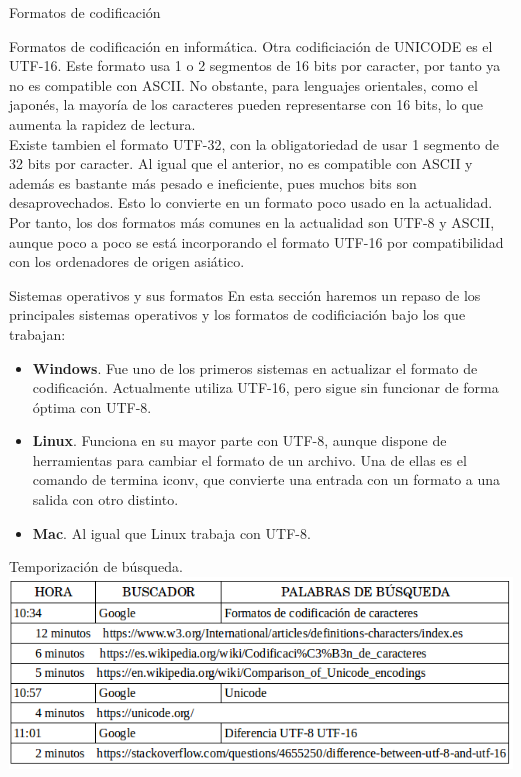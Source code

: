 \begin{section}{Formatos de codificaci\'on}
\begin{subsection}{Formatos de codificación en informática.}
			Otra codificiación de UNICODE es el UTF-16. Este formato usa 1 o 2 segmentos de 16 bits por caracter, por tanto ya no es compatible con ASCII. No obstante, para lenguajes orientales, como el japonés, la mayoría de los caracteres pueden representarse con 16 bits, lo que aumenta la rapidez de lectura. \\ 
			
			Existe tambien el formato UTF-32, con la obligatoriedad de usar 1 segmento de 32 bits por caracter. Al igual que el anterior, no es compatible con ASCII y además es bastante más pesado e ineficiente, pues muchos bits son desaprovechados. Esto lo convierte en un formato poco usado en la actualidad. \\
			
			Por tanto, los dos formatos más comunes en la actualidad son UTF-8 y ASCII, aunque poco a poco se está incorporando el formato UTF-16 por compatibilidad con los ordenadores de origen asiático.
			
			
		\end{subsection}
		
		\begin{subsection}{Sistemas operativos y sus formatos}
			En esta sección haremos un repaso de los principales sistemas operativos y los formatos de codificiación bajo los que trabajan:
			
			\begin{itemize}
				\item \textbf{Windows}. Fue uno de los primeros sistemas en actualizar el formato de codificación. Actualmente utiliza UTF-16, pero sigue sin funcionar de forma óptima con UTF-8.
				
				\item \textbf{Linux}. Funciona en su mayor parte con UTF-8, aunque dispone de herramientas para cambiar el formato de un archivo. Una de ellas es el comando de termina iconv, que convierte una entrada con un formato a una salida con otro distinto.   
				
				\item \textbf{Mac}. Al igual que Linux trabaja con UTF-8.
				
			\end{itemize}
		\end{subsection}
		
		\begin{subsection}{Temporizaci\'on de b\'usqueda.}
			\includegraphics[width=1\textwidth]{codificacion_tiempos.png}
		\end{subsection}
		
	\end{section}
	
